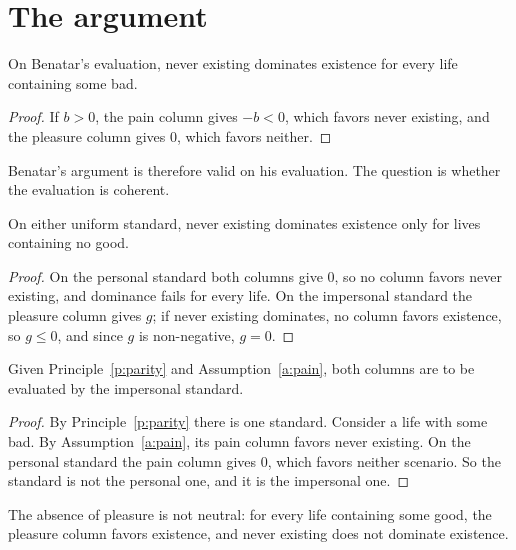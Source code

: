 \documentclass{situationist-preprint}
\begin{document}
\section{The argument}

\begin{proposition}[Validity]\label{p:valid}
On Benatar's evaluation, never existing dominates existence for every life containing some bad.
\end{proposition}

\begin{proof}
If $b > 0$, the pain column gives $-b < 0$, which favors never existing, and the pleasure column gives $0$, which favors neither.
\end{proof}

Benatar's argument is therefore valid on his evaluation. The question is whether the evaluation is coherent.

\begin{theorem}\label{t:uniform}
On either uniform standard, never existing dominates existence only for lives containing no good.
\end{theorem}

\begin{proof}
On the personal standard both columns give $0$, so no column favors never existing, and dominance fails for every life. On the impersonal standard the pleasure column gives $g$; if never existing dominates, no column favors existence, so $g \le 0$, and since $g$ is non-negative, $g = 0$.
\end{proof}

\begin{lemma}\label{l:impersonal}
Given Principle~\ref{p:parity} and Assumption~\ref{a:pain}, both columns are to be evaluated by the impersonal standard.
\end{lemma}

\begin{proof}
By Principle~\ref{p:parity} there is one standard. Consider a life with some bad. By Assumption~\ref{a:pain}, its pain column favors never existing. On the personal standard the pain column gives $0$, which favors neither scenario. So the standard is not the personal one, and it is the impersonal one.
\end{proof}

\begin{corollary}\label{c:nonneutral}
The absence of pleasure is not neutral: for every life containing some good, the pleasure column favors existence, and never existing does not dominate existence.
\end{corollary}
\end{document}
